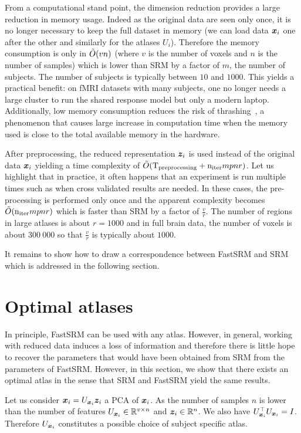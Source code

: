 From a computational stand point, the dimension reduction provides
a large reduction in memory usage. Indeed as the original data are seen only
once, it is no longer necessary to keep the full dataset in memory (we can load
data $\boldsymbol{x}_i$ one after the other and similarly for the atlases $U_i$). Therefore
the memory consumption is only in $\tilde{O}(vn)$ (where $v$ is the number of voxels
and $n$ is the number of samples) which is lower than SRM by a factor of $m$,
the number of subjects. The number of subjects is typically between $10$ and
$1000$. This yields a practical benefit: on fMRI datasets with many subjects, one no longer needs a large cluster to run the shared response model but only a modern laptop.
Additionally, low memory consumption reduces the
risk of thrashing~\cite{denning1968thrashing}, a phenomenon that causes large
increase in computation time when the memory used is close to the total available
memory in the hardware.

After preprocessing, the reduced representation $\boldsymbol{z}_i$ is used instead of the
original data $\boldsymbol{x}_i$ yielding a time complexity of $\tilde{O}(
\mathrm{T_{preprocessing}} + \mathrm{n_{iter}} mpnr)$.
Let us highlight that in practice, it often happens that an experiment is run
multiple times such as when cross validated results are needed. In these cases,
the pre-processing is performed only once and the apparent complexity becomes
$\tilde{O}(\mathrm{n_{iter}} mpnr)$ which is faster than SRM by
a factor of $\frac{v}{r}$. The number of regions in large atlases is about $r=1000$ and in full brain data, the number of voxels is about $300~000$ so that $\frac{v}{r}$ is typically about $1000$.

It remains to show how to draw a correspondence between FastSRM and SRM which is addressed in the following section.

\section{Optimal atlases}
In principle, FastSRM can be used with any atlas. 
However, in general, working with reduced data induces a loss of information and
therefore there is little hope to recover the parameters that would have been obtained from SRM from the parameters of FastSRM.
However, in this section, we show that there exists an optimal atlas in the sense that SRM and FastSRM yield the same results.

Let us consider $\boldsymbol{x}_i = U_{\boldsymbol{x}_i} \boldsymbol{z}_i$ a PCA of $\boldsymbol{x}_i$. As the number of
samples $n$ is lower than the number of features $U_{\boldsymbol{x}_i} \in \mathbb{R}^{v \times n}$ and $\boldsymbol{z}_i \in \mathbb{R}^{n}$.  We also have $U_{\boldsymbol{x}_i}^{\top}U_{\boldsymbol{x}_i} = I$.
Therefore $U_{\boldsymbol{x}_i}$ constitutes a possible choice of subject specific atlas.

